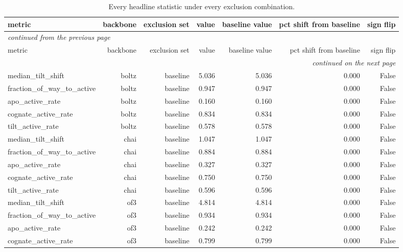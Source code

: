 \begingroup\footnotesize\setlength{\tabcolsep}{3pt}
\begin{longtable}{lrrrrrr}
\caption{Every headline statistic under every exclusion combination.}
\label{tab:t5_exclusion_sweep}\\
\toprule
metric & backbone & exclusion set & value & baseline value & pct shift from baseline & sign flip \\
\midrule
\endfirsthead
\multicolumn{7}{l}{\scriptsize\itshape continued from the previous page}\\
\toprule
metric & backbone & exclusion set & value & baseline value & pct shift from baseline & sign flip \\
\midrule
\endhead
\midrule
\multicolumn{7}{r}{\scriptsize\itshape continued on the next page}\\
\endfoot
\bottomrule
\endlastfoot
median\_tilt\_shift & boltz & baseline & 5.036 & 5.036 & 0.000 & False \\
fraction\_of\_way\_to\_active & boltz & baseline & 0.947 & 0.947 & 0.000 & False \\
apo\_active\_rate & boltz & baseline & 0.160 & 0.160 & 0.000 & False \\
cognate\_active\_rate & boltz & baseline & 0.834 & 0.834 & 0.000 & False \\
tilt\_active\_rate & boltz & baseline & 0.578 & 0.578 & 0.000 & False \\
median\_tilt\_shift & chai & baseline & 1.047 & 1.047 & 0.000 & False \\
fraction\_of\_way\_to\_active & chai & baseline & 0.884 & 0.884 & 0.000 & False \\
apo\_active\_rate & chai & baseline & 0.327 & 0.327 & 0.000 & False \\
cognate\_active\_rate & chai & baseline & 0.750 & 0.750 & 0.000 & False \\
tilt\_active\_rate & chai & baseline & 0.596 & 0.596 & 0.000 & False \\
median\_tilt\_shift & of3 & baseline & 4.814 & 4.814 & 0.000 & False \\
fraction\_of\_way\_to\_active & of3 & baseline & 0.934 & 0.934 & 0.000 & False \\
apo\_active\_rate & of3 & baseline & 0.242 & 0.242 & 0.000 & False \\
cognate\_active\_rate & of3 & baseline & 0.799 & 0.799 & 0.000 & False \\

\end{longtable}
